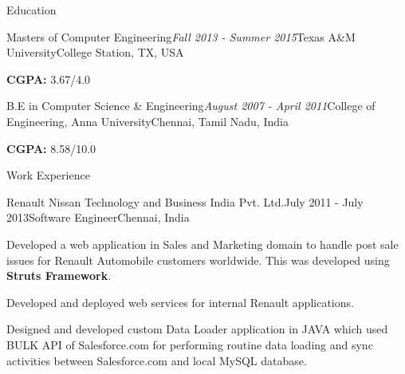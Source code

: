 \documentclass{resume} %
\begin{document}

\begin{rSection}{Education}

\begin{rSubsection}{Masters of Computer Engineering}{\em Fall 2013 - Summer 2015}{Texas A\&M University}{College Station, TX, USA}
\item {\bf CGPA:} 3.67/4.0
\end{rSubsection}

\begin{rSubsection}{B.E in Computer Science \& Engineering}{\em August 2007 - April 2011}{College of Engineering, Anna University}{Chennai, Tamil Nadu, India}
\item {\bf CGPA:} 8.58/10.0
\end{rSubsection}


\end{rSection}


\begin{rSection}{Work Experience}

\begin{rSubsection}{Renault Nissan Technology and Business India Pvt. Ltd.}{July 2011 - July 2013}{Software Engineer}{Chennai, India}
\item Developed a web application in Sales and Marketing domain to handle post sale issues for Renault Automobile customers worldwide.
This was developed using {\bf Struts Framework}.
\item Developed and deployed web services for internal Renault applications.
\item Designed and developed custom Data Loader application in JAVA which used BULK API of Salesforce.com for performing routine data loading and sync activities between Salesforce.com and local MySQL database.
\end{rSubsection}


\end{rSection}
\end{document}

